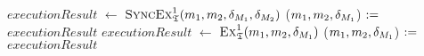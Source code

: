 \begin{algorithmic}[1]
            \State \Return{$\bot$}
        \EndIf
         \label{algo:synchronization:executesynchronizingbidirectionaltransformation:line:synchronizationstart}
            \State $executionResult$ $\leftarrow$ $\textsc{SyncEx}_{\mathfrak{T}}^1(m_{1}, m_{2}, \delta_{M_{1}}, \delta_{M_{2}})$
                \State \Return{$\bot$} \label{algo:synchronization:executesynchronizingbidirectionaltransformation:line:returnbot1}
            \Else
                \State ($m_{1}, 
                m_{2}, \delta_{M_{1}}$) $:=$ $executionResult$
            \EndIf
        \EndIf \label{algo:synchronization:executesynchronizingbidirectionaltransformation:line:synchronizationend}
            \State $executionResult$ $\leftarrow$ $\textsc{Ex}_{\mathfrak{T}}^1(m_{1}, m_{2}, \delta_{M_{1}})$
                \State \Return{$\bot$} \label{algo:executesynchronizingbidirectionaltransformation:line:returnbot2}
            \Else
                \State ($m_{1}, m_{2}, \delta_{M_{1}}$) $:=$ $executionResult$
            \EndIf
        \EndWhile
        \State {} \label{algo:synchronization:executesynchronizingbidirectionaltransformation:line:returnresult}
    \EndProcedure
\end{algorithmic}